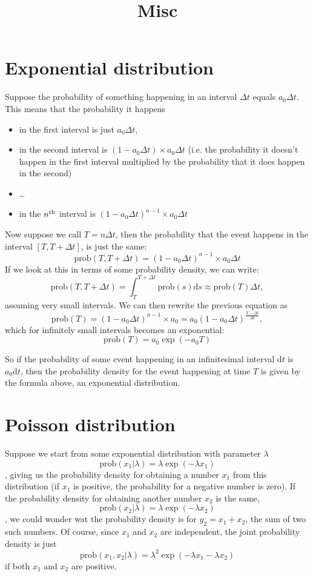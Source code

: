 \documentclass[a4paper,11pt]{article}
\newcommand{\ud}{\mathrm{d}}
\newcommand{\mcm}{\mathrm{,}}
\newcommand{\prob}{\mathrm{prob}}
\begin{document}
	\title{\bf Misc}
	\maketitle

	\section{Exponential distribution}

		Suppose the probability of something happening in an interval $\Delta t$ equals $a_0 \Delta t$.
		This means that the probability it happens
		\begin{itemize}
			\item in the first interval is just $a_0 \Delta t$,
			\item in the second interval is $(1-a_0 \Delta t) \times a_0\Delta t$ (i.e. the probability
			      it doesn't happen in the first interval multiplied by the probability that it does
				  happen in the second)
			\item \ldots
			\item in the $n^{\rm th}$ interval is $(1-a_0 \Delta t)^{n-1} \times a_0\Delta t$
		\end{itemize}

		Now suppose we call $T = n\Delta t$, then the probability that the event happens in the interval
		$[T,T+\Delta t]$, is just the same:
		\[ \prob(T,T+\Delta t) = (1-a_0 \Delta t)^{n-1} \times a_0\Delta t \]
		If we look at this in terms of some probability density, we can write:
		\[ \prob(T,T+\Delta t) = \int_T^{T+\Delta t} \prob(s) \ud s \approx \prob(T)\Delta t \mcm \]
		assuming very small intervals. We can then rewrite the previous equation as
		\[ \prob(T) = (1-a_0 \Delta t)^{n-1} \times a_0 = a_0 (1-a_0 \Delta t)^{\frac{T-\Delta t}{\Delta t}}\mcm \]
		which for infinitely small intervals becomes an exponential:
		\[ \prob(T) = a_0 \exp(-a_0 T) \]

		So if the probability of some event happening in an infinitesimal interval $\ud t$ is $a_0 \ud t$, then
		the probability density for the event happening at time $T$ is given by the formula above, an exponential
		distribution.

	\section{Poisson distribution}

		Suppose we start from some exponential distribution with parameter $\lambda$
		\[ \prob(x_1 | \lambda) = \lambda \exp(-\lambda x_1) \],
		giving us the probability density for obtaining a number $x_1$ from this distribution (if $x_1$ is
		positive, the probability for a negative number is zero).
		If the probability density for obtaining another number $x_2$ is the same,
		\[ \prob(x_2 | \lambda) = \lambda \exp(-\lambda x_2) \],
		we could wonder wat the probability density is for $y_2 = x_1 + x_2$, the sum of two such numbers. Of
		course, since $x_1$ and $x_2$ are independent, the joint probability density is just
		\[ \prob(x_1,x_2| \lambda) = \lambda^2\exp(-\lambda x_1 -\lambda x_2)\]
		if both $x_1$ and $x_2$ are positive.
\end{document}
